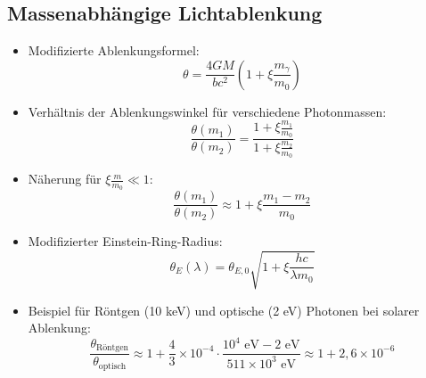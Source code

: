 \documentclass[12pt,a4paper]{article}
\begin{document}
\subsection{Massenabhängige Lichtablenkung}
\begin{itemize}
	\item Modifizierte Ablenkungsformel:
	\begin{equation}
		\boxed{\theta = \frac{4GM}{bc^2}\left(1 + \xi \frac{m_\gamma}{m_0}\right)}
	\end{equation}
	
	\item Verhältnis der Ablenkungswinkel für verschiedene Photonmassen:
	\begin{equation}
		\frac{\theta(m_1)}{\theta(m_2)} = \frac{1 + \xi \frac{m_1}{m_0}}{1 + \xi \frac{m_2}{m_0}}
	\end{equation}
	
	\item Näherung für $\xi \frac{m}{m_0} \ll 1$:
	\begin{equation}
		\frac{\theta(m_1)}{\theta(m_2)} \approx 1 + \xi \frac{m_1 - m_2}{m_0}
	\end{equation}
	
	\item Modifizierter Einstein-Ring-Radius:
	\begin{equation}
		\theta_E(\lambda) = \theta_{E,0} \sqrt{1 + \xi \frac{hc}{\lambda m_0}}
	\end{equation}
	
	\item Beispiel für Röntgen (10 keV) und optische (2 eV) Photonen bei solarer Ablenkung:
	\begin{equation}
		\frac{\theta_{\text{Röntgen}}}{\theta_{\text{optisch}}} \approx 1 + \frac{4}{3} \times 10^{-4} \cdot \frac{10^4 \text{ eV} - 2 \text{ eV}}{511 \times 10^3 \text{ eV}} \approx 1 + 2,6 \times 10^{-6}
	\end{equation}
\end{itemize}
\end{document}
